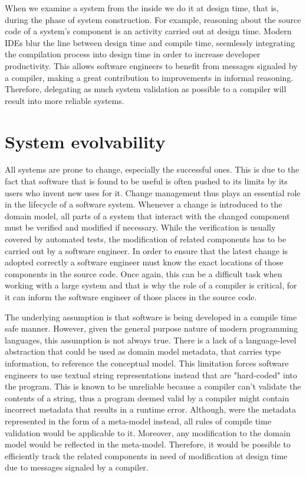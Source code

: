 \n

When we examine a system from the inside we do it at design time, that is, during the phase of system construction.
For example, reasoning about the source code of a system's component is an activity carried out at design time.
Modern IDEs blur the line between design time and compile time, seemlessly integrating the compilation process into design time in order to increase developer productivity.
This allows software engineers to benefit from messages signaled by a compiler, making a great contribution to improvements in informal reasoning.
Therefore, delegating as much system validation as possible to a compiler will result into more reliable systems.

\section{System evolvability}
All systems are prone to change, especially the successful ones.
This is due to the fact that software that is found to be useful is often pushed to its limits by its users who invent new uses for it.
Change management thus plays an essential role in the lifecycle of a software system.
Whenever a change is introduced to the domain model, all parts of a system that interact with the changed component must be verified and modified if necessary.
While the verification is usually covered by automated tests, the modification of related components has to be carried out by a software engineer.
In order to ensure that the latest change is adopted correctly a software engineer must know the exact locations of those components in the source code.
Once again, this can be a difficult task when working with a large system and that is why the role of a compiler is critical, for it can inform the software engineer of those places in the source code.

\n

The underlying assumption is that software is being developed in a compile time safe manner.
However, given the general purpose nature of modern programming languages, this assumption is not always true.
There is a lack of a language-level abstraction that could be used as domain model metadata, that carries type information, to reference the conceptual model.
This limitation forces software engineers to use textual string representations instead that are "hard-coded" into the program.
This is known to be unreliable because a compiler can't validate the contents of a string, thus a program deemed valid by a compiler might contain incorrect metadata that results in a runtime error.
Although, were the metadata represented in the form of a meta-model instead, all rules of compile time validation would be applicable to it.
Moreover, any modification to the domain model would be reflected in the meta-model.
Therefore, it would be possible to efficiently track the related components in need of modification at design time due to messages signaled by a compiler.

